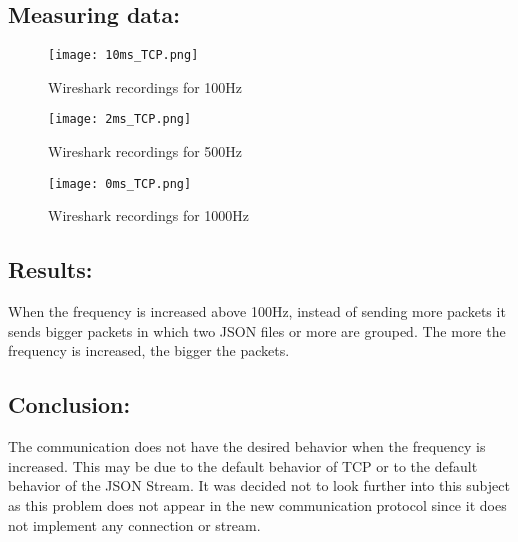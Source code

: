 \subsection*{Measuring data:}

	\begin{figure}[h]
		\centering
		\texttt{[image: 10ms\_TCP.png]}
		\caption{Wireshark recordings for 100Hz}
		\label{fig:10ms_tcp}
	\end{figure}
	\begin{figure}[h]
		\centering
		\texttt{[image: 2ms\_TCP.png]}
		\caption{Wireshark recordings for 500Hz}
		\label{fig:2ms_tcp}
	\end{figure}
	\begin{figure}[h]
		\centering
		\texttt{[image: 0ms\_TCP.png]}
		\caption{Wireshark recordings for 1000Hz}
		\label{fig:0ms_tcp}
	\end{figure}


\subsection*{Results:}

When the frequency is increased above 100Hz, instead of sending more packets it sends bigger packets in which two \gls{JSON} files or more are grouped. The more the frequency is increased, the bigger the packets. 

\subsection*{Conclusion:}

The communication does not have the desired behavior when the frequency is increased. This may be due to the default behavior of TCP or to the default behavior of the JSON Stream. It was decided not to look further into this subject as this problem does not appear in the new communication protocol since it does not implement any connection or stream.